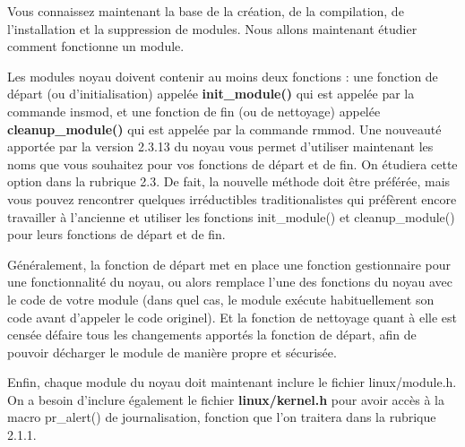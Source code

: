 \documentclass[11pt]{article}
\begin{document}
Vous connaissez maintenant la base de la création, de la compilation, de l'installation et la suppression de modules. Nous allons maintenant étudier comment fonctionne un module.

Les modules noyau doivent contenir au moins deux fonctions : une fonction de départ (ou d'initialisation) appelée \textbf{init\_module()} qui est appelée par la commande insmod, et une fonction de fin (ou de nettoyage) appelée \textbf{cleanup\_module()} qui est appelée par la commande rmmod. Une nouveauté apportée par la version 2.3.13 du noyau vous permet d'utiliser maintenant les noms que vous souhaitez pour vos fonctions de départ et de fin. On étudiera cette option dans la rubrique 2.3. De fait, la nouvelle méthode doit être préférée, mais vous pouvez rencontrer quelques irréductibles traditionalistes qui préfèrent encore travailler à l'ancienne et utiliser les fonctions init\_module() et cleanup\_module() pour leurs fonctions de départ et de fin.

Généralement, la fonction de départ met en place une fonction gestionnaire pour une fonctionnalité du noyau, ou alors remplace l'une des fonctions du noyau avec le code de votre module (dans quel cas, le module exécute habituellement son code avant d'appeler le code originel). Et la fonction de nettoyage quant à elle est censée défaire tous les changements apportés la fonction de départ, afin de pouvoir décharger le module de manière propre et sécurisée.

Enfin, chaque module du noyau doit maintenant inclure le fichier linux/module.h. On a besoin d'inclure également le fichier \textbf{linux/kernel.h} pour avoir accès à la macro pr\_alert() de journalisation, fonction que l'on traitera dans la rubrique 2.1.1.
\end{document}
